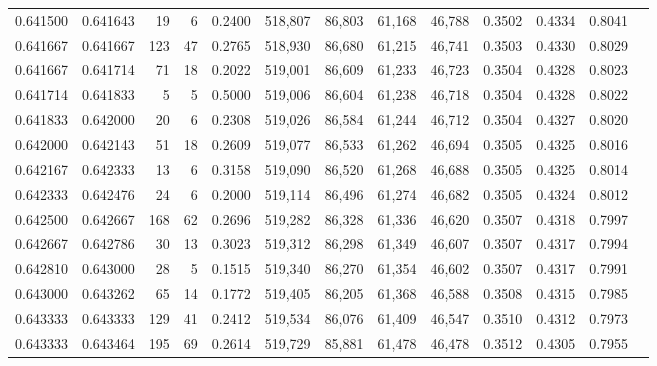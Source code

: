 \begin{tabular}{rrrrrrrrrrrrr}
0.641500 & 0.641643 &    19 &   6 &                                     0.2400 & 518,807 &  86,803 &  61,168 &  46,788 & 0.3502 & 0.4334 & 0.8041 \\
0.641667 & 0.641667 &   123 &  47 &                                     0.2765 & 518,930 &  86,680 &  61,215 &  46,741 & 0.3503 & 0.4330 & 0.8029 \\
0.641667 & 0.641714 &    71 &  18 &                                     0.2022 & 519,001 &  86,609 &  61,233 &  46,723 & 0.3504 & 0.4328 & 0.8023 \\
0.641714 & 0.641833 &     5 &   5 &                                     0.5000 & 519,006 &  86,604 &  61,238 &  46,718 & 0.3504 & 0.4328 & 0.8022 \\
0.641833 & 0.642000 &    20 &   6 &                                     0.2308 & 519,026 &  86,584 &  61,244 &  46,712 & 0.3504 & 0.4327 & 0.8020 \\
0.642000 & 0.642143 &    51 &  18 &                                     0.2609 & 519,077 &  86,533 &  61,262 &  46,694 & 0.3505 & 0.4325 & 0.8016 \\
0.642167 & 0.642333 &    13 &   6 &                                     0.3158 & 519,090 &  86,520 &  61,268 &  46,688 & 0.3505 & 0.4325 & 0.8014 \\
0.642333 & 0.642476 &    24 &   6 &                                     0.2000 & 519,114 &  86,496 &  61,274 &  46,682 & 0.3505 & 0.4324 & 0.8012 \\
0.642500 & 0.642667 &   168 &  62 &                                     0.2696 & 519,282 &  86,328 &  61,336 &  46,620 & 0.3507 & 0.4318 & 0.7997 \\
0.642667 & 0.642786 &    30 &  13 &                                     0.3023 & 519,312 &  86,298 &  61,349 &  46,607 & 0.3507 & 0.4317 & 0.7994 \\
0.642810 & 0.643000 &    28 &   5 &                                     0.1515 & 519,340 &  86,270 &  61,354 &  46,602 & 0.3507 & 0.4317 & 0.7991 \\
0.643000 & 0.643262 &    65 &  14 &                                     0.1772 & 519,405 &  86,205 &  61,368 &  46,588 & 0.3508 & 0.4315 & 0.7985 \\
0.643333 & 0.643333 &   129 &  41 &                                     0.2412 & 519,534 &  86,076 &  61,409 &  46,547 & 0.3510 & 0.4312 & 0.7973 \\
0.643333 & 0.643464 &   195 &  69 &                                     0.2614 & 519,729 &  85,881 &  61,478 &  46,478 & 0.3512 & 0.4305 & 0.7955 \\

\end{tabular}
